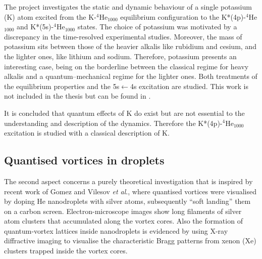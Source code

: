		The project investigates the static and dynamic behaviour of a single potassium (K) atom excited from the K-$^4$He$_{1000}$ equilibrium configuration to the K*(4p)-$^4$He$_{1000}$ and K*(5s)-$^4$He$_{1000}$ states. The choice of potassium was motivated by a discrepancy in the time-resolved experimental studies\citep{Schulz2001,Reho2000-1,Reho2000-2}. Moreover, the mass of potassium sits between those of the heavier alkalis like rubidium and cesium, and the lighter ones, like lithium and sodium. Therefore, potassium presents an interesting case, being on the borderline between the classical regime for heavy alkalis and a quantum--mechanical regime for the lighter ones. Both treatments of the equilibrium properties and the 5s$\leftarrow$4s excitation are studied. This work is not included in the thesis but can be found in .
	
		It is concluded that quantum effects of K do exist but are not essential to the understanding and description of the dynamics. Therefore the K*(4p)-$^4$He$_{1000}$ excitation is studied with a classical description of K.

	\subsection*{Quantised vortices in droplets}
		The second aspect concerns a purely theoretical investigation that is inspired by recent work of Gomez and Vilesov \emph{et al}., where quantised vortices were visualised by doping He nanodroplets with silver atoms, subsequently ``soft landing'' them on a carbon screen. Electron-microscope images show long filaments of silver atom clusters that accumulated along the vortex cores. Also the formation of quantum-vortex lattices inside nanodroplets is evidenced by using X-ray diffractive imaging to visualise the characteristic Bragg patterns from xenon (Xe) clusters trapped inside the vortex cores.
		
